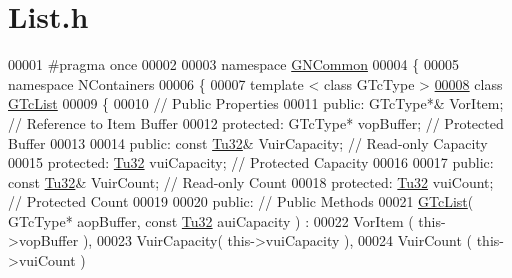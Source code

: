 \hypertarget{_list_8h_source}{}\section{List.\+h}
\label{_list_8h_source}

\begin{DoxyCode}
00001 \textcolor{preprocessor}{#pragma once}
00002 
00003 \textcolor{keyword}{namespace }\mbox{\hyperlink{namespace_g_n_common}{GNCommon}}
00004 \{
00005    \textcolor{keyword}{namespace }NContainers
00006    \{
00007       \textcolor{keyword}{template} < \textcolor{keyword}{class} GTcType >
\mbox{\hyperlink{class_g_n_common_1_1_n_containers_1_1_g_tc_list}{00008}}       \textcolor{keyword}{class }\mbox{\hyperlink{class_g_n_common_1_1_n_containers_1_1_g_tc_list}{GTcList}}
00009       \{
00010        \textcolor{comment}{// Public Properties}
00011       \textcolor{keyword}{public}:    GTcType*& VorItem;   \textcolor{comment}{// Reference to Item Buffer}
00012       \textcolor{keyword}{protected}: GTcType*  vopBuffer; \textcolor{comment}{// Protected Buffer}
00013 
00014       \textcolor{keyword}{public}:    \textcolor{keyword}{const} \mbox{\hyperlink{namespace_g_n_common_a941b527ef318f318aed7903dc832b7e4}{Tu32}}& VuirCapacity; \textcolor{comment}{// Read-only Capacity}
00015       \textcolor{keyword}{protected}: \mbox{\hyperlink{namespace_g_n_common_a941b527ef318f318aed7903dc832b7e4}{Tu32}}        vuiCapacity;  \textcolor{comment}{// Protected Capacity}
00016 
00017       \textcolor{keyword}{public}:    \textcolor{keyword}{const} \mbox{\hyperlink{namespace_g_n_common_a941b527ef318f318aed7903dc832b7e4}{Tu32}}& VuirCount; \textcolor{comment}{// Read-only Count}
00018       \textcolor{keyword}{protected}: \mbox{\hyperlink{namespace_g_n_common_a941b527ef318f318aed7903dc832b7e4}{Tu32}}        vuiCount;  \textcolor{comment}{// Protected Count }
00019       
00020       \textcolor{keyword}{public}:        \textcolor{comment}{// Public Methods}
00021          \mbox{\hyperlink{class_g_n_common_1_1_n_containers_1_1_g_tc_list}{GTcList}}( GTcType* aopBuffer, \textcolor{keyword}{const} \mbox{\hyperlink{namespace_g_n_common_a941b527ef318f318aed7903dc832b7e4}{Tu32}} auiCapacity ) :
00022             VorItem     ( this->vopBuffer   ),
00023             VuirCapacity( this->vuiCapacity ),
00024             VuirCount   ( this->vuiCount    )

\end{DoxyCode}
